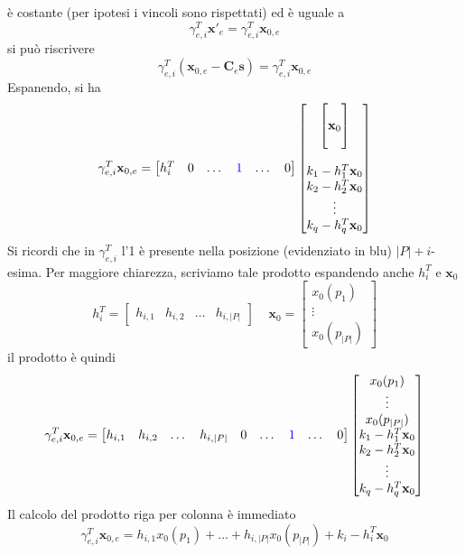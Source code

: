 \documentclass[10pt, letterpaper]{report}
\begin{document}
è costante (per ipotesi i vincoli sono rispettati) ed è uguale a 
$$ \gamma_{e,i}^T\mathbf x'_e=
\gamma_{e,i}^T\mathbf x_{0,e}
$$
si può riscrivere 
$$ \gamma_{e,i}^T(\mathbf  x_{0,e}-\mathbf C_e\mathbf s)=
\gamma_{e,i}^T\mathbf x_{0,e}
$$
Espanendo, si ha 
$$\gamma_{e,i}^T\mathbf x_{0,e}= \begin{bmatrix}
    h_i^T & 0 & \dots & \color{blue}1\color{black} & \dots & 0
\end{bmatrix}\begin{bmatrix}
    \begin{bmatrix}
        \\ \mathbf x_0 \\ \hphantom{a}
    \end{bmatrix}\\ \\
    k_1-h_1^T\mathbf x_0\\
    k_2-h_2^T\mathbf x_0\\ \vdots \\ 
    k_q-h_q^T\mathbf x_0
\end{bmatrix}$$
Si ricordi che in $\gamma_{e,i}^T$ l'1 è presente nella posizione (evidenziato in blu) $|P|+i$-esima.
Per maggiore chiarezza, scriviamo tale prodotto espandendo anche $h_i^T$ e $\mathbf x_0$
$$ h_i^T=\begin{bmatrix}
    h_{i,1} & h_{i,2} & \dots & h_{i,|P|}
\end{bmatrix} \ \ \ \ \  
\mathbf x_0=\begin{bmatrix}
    x_0(p_1)\\ \vdots \\  x_0(p_{|P|})
\end{bmatrix}
$$
il prodotto è quindi
$$ 
\gamma_{e,i}^T\mathbf x_{0,e}=
\begin{bmatrix}
    h_{i,1} & h_{i,2} & \dots & h_{i,|P|} & 0 & \dots & \color{blue}1\color{black} & \dots & 0
\end{bmatrix}\begin{bmatrix}
    x_0(p_1)\\ \vdots \\  x_0(p_{|P|}) \\
    k_1-h_1^T\mathbf x_0\\
    k_2-h_2^T\mathbf x_0\\ \vdots \\ 
    k_q-h_q^T\mathbf x_0
\end{bmatrix}
$$
Il calcolo del prodotto riga per colonna è immediato 
$$ \gamma_{e,i}^T\mathbf x_{0,e}=
h_{i,1}x_0(p_1)+ \dots + h_{i,|P|}x_0(p_{|P|})+k_i-h_i^T\mathbf x_0$$
\end{document}
